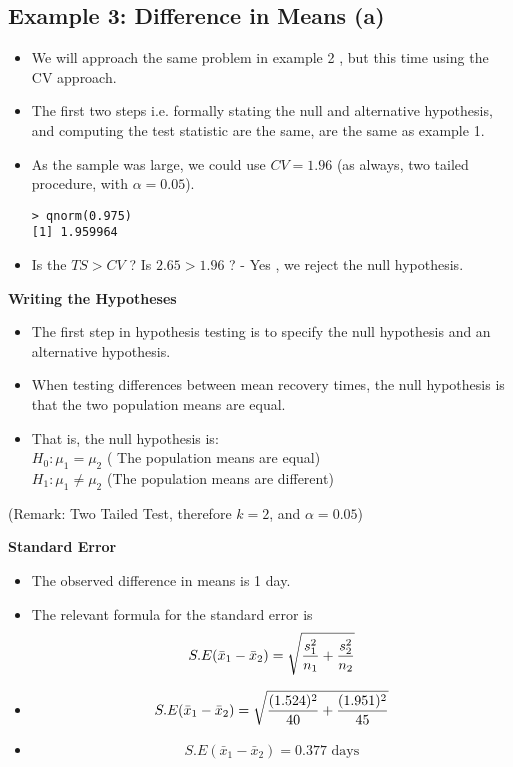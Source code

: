 \documentclass[a4paper,12pt]{article}
\begin{document}

\subsection*{Example 3: Difference in Means (a) }
\begin{itemize}
\item We will approach the same problem in example 2 , but this time using the CV approach.
\item The first two steps i.e. formally stating the null and alternative hypothesis, and computing the test statistic are the same, are the same as example 1.
\item As the sample was large, we could use $CV = 1.96$ (as always, two tailed procedure, with $\alpha=0.05$).
\begin{verbatim}
> qnorm(0.975)
[1] 1.959964
\end{verbatim}
\item Is the $TS > CV$ ?   Is $2.65 > 1.96$ ? - Yes , we reject the null hypothesis.
\end{itemize}



\noindent \textbf{Writing the Hypotheses}
\begin{itemize}
\item The first step in hypothesis testing is to specify the null hypothesis and an alternative hypothesis.
\item When testing differences between mean recovery times, the null hypothesis is that the two population means are equal.
\item That is, the null hypothesis is:\\
$H_0: \mu_1 = \mu_2$ ( The population means are equal)\\
$H_1: \mu_1 \neq \mu_2$ (The population means are different)
\end{itemize}



(Remark: Two Tailed Test, therefore $k = 2$, and $\alpha = 0.05$)



\noindent \textbf{Standard Error}
\begin{itemize}
\item The observed difference in means is 1 day.
\item The relevant formula for the standard error is
\[ S.E(\bar{x}_1 - \bar{x}_2) = \sqrt{{s^2_1\over n_1}+{s^2_2 \over n_2}} \]
\item  \[ S.E(\bar{x}_1 - \bar{x}_2) = \sqrt{{(1.524)^2 \over 40}+{(1.951)^2 \over 45}}   \]
\item  \[ S.E(\bar{x}_1 - \bar{x}_2) = 0.377\mbox{ days}\]
\end{itemize}
\end{document}
